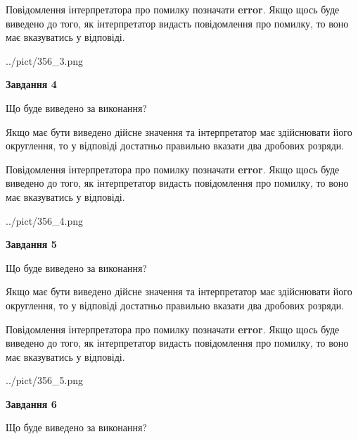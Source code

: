 \documentclass[12pt, ukrainian]{article}
\begin{document}
{\begin {Large}
Повідомлення інтерпретатора про помилку позначати \textbf{error}.
Якщо щось буде виведено до того, як інтерпретатор видасть повідомлення про помилку, 
то воно має вказуватись у відповіді. \par

\begin{center}
	{../pict/356_3.png}
\end{center}
\newpage

{\begin {center}\textbf{Завдання 4}\end {center}}\par
Що буде виведено за виконання? \par

Якщо має бути виведено дійсне значення та інтерпретатор має здійснювати його округлення, 
то у відповіді достатньо правильно вказати два дробових розряди.

Повідомлення інтерпретатора про помилку позначати \textbf{error}.
Якщо щось буде виведено до того, як інтерпретатор видасть повідомлення про помилку, 
то воно має вказуватись у відповіді. \par

\begin{center}
	{../pict/356_4.png}
\end{center}
\newpage

{\begin {center}\textbf{Завдання 5}\end {center}}\par
Що буде виведено за виконання? \par

Якщо має бути виведено дійсне значення та інтерпретатор має здійснювати його округлення, 
то у відповіді достатньо правильно вказати два дробових розряди.

Повідомлення інтерпретатора про помилку позначати \textbf{error}.
Якщо щось буде виведено до того, як інтерпретатор видасть повідомлення про помилку, 
то воно має вказуватись у відповіді. \par

\begin{center}
	{../pict/356_5.png}
\end{center}
\newpage

{\begin {center}\textbf{Завдання 6}\end {center}}\par
Що буде виведено за виконання? \par


\end{Large}}
\end{document}

